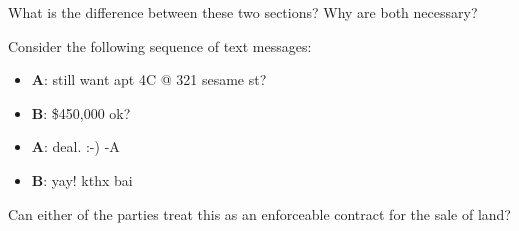 
\item What is the difference between these two sections? Why are both necessary?

\item Consider the following sequence of text messages:
\begin{itemize}
\item \textbf{A}: still want apt 4C @ 321 sesame st?

\item \textbf{B}: \$450,000 ok?

\item \textbf{A}: deal. :-) -A

\item \textbf{B}: yay! kthx bai 
\end{itemize}
Can either of the parties treat this as an enforceable contract for the sale of
land?
